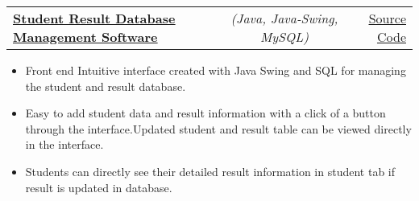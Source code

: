 \documentclass[a4paper,11pt]{article}
\makeatletter
\newcommand{\resumeItem}[1]{
  \item\small{#1}
}
\newcommand{\resumeItemListStart}{\begin{itemize}[rightmargin=0.11in]}
\newcommand{\resumeItemListEnd}{\end{itemize}}
\newcommand{\resumeTrioHeading}[3]{
  \item\small{
    \begin{tabular*}{0.96\textwidth}[t]{
      l@{\extracolsep{\fill}}c@{\extracolsep{\fill}}r
    }
      \textbf{#1} & \textit{#2} & #3
    \end{tabular*}
  }
}
\makeatother
\begin{document}



    \resumeTrioHeading{\href{https://github.com/rauchrods/Student-data-and-results-database-management}{\uline{Student Result Database Management Software}}}{(Java, Java-Swing, MySQL) }{\href{https://github.com/rauchrods/Student-data-and-results-database-management}{\uline{Source Code}}}
      \resumeItemListStart{}
        \resumeItem{Front end Intuitive interface created with Java Swing and SQL for
managing the student and result database.}
        \resumeItem{Easy to add student data and result information with a click of a
button through the interface.Updated student and result table can be
viewed directly in the interface.}
        \resumeItem{Students can directly see their detailed result information in student
tab if result is updated in database.}
      \resumeItemListEnd{}
\end{document}
